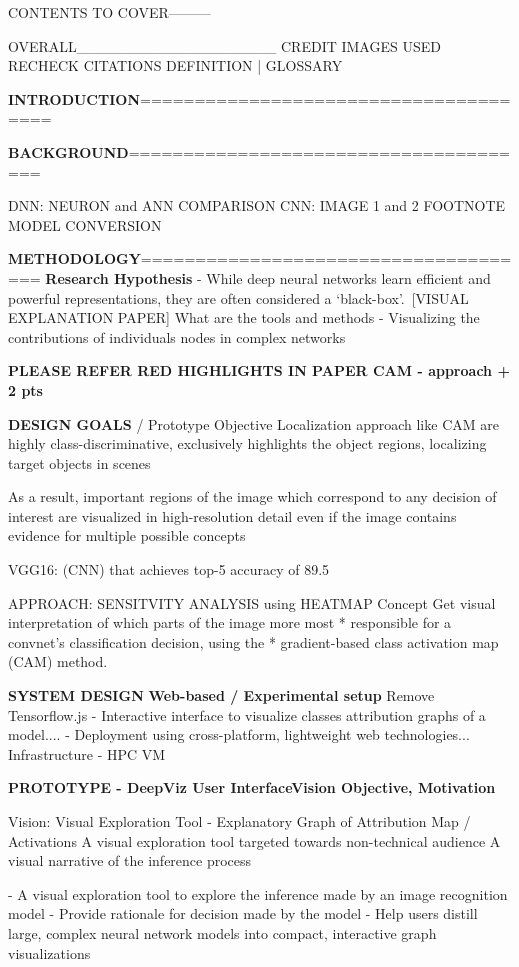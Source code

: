 CONTENTS TO COVER---------

OVERALL___________________
CREDIT IMAGES USED
RECHECK CITATIONS
DEFINITION | GLOSSARY

\textbf{INTRODUCTION}======================================

\textbf{BACKGROUND}======================================

DNN: NEURON  and ANN COMPARISON
CNN: IMAGE 1 and 2 FOOTNOTE
MODEL CONVERSION

\textbf{METHODOLOGY}=====================================
\textbf{Research Hypothesis}
- While deep neural networks learn efficient and powerful representations, they are often considered a ‘black-box’. [VISUAL EXPLANATION PAPER] What are the tools and methods 
- Visualizing the contributions of individuals nodes in complex networks

\textbf{PLEASE REFER RED HIGHLIGHTS IN PAPER CAM - approach + 2 pts}

\textbf{DESIGN GOALS} / Prototype Objective
Localization approach like CAM are highly class-discriminative, exclusively highlights the object regions, localizing target objects in scenes

As a result, important regions of the image which correspond
to any decision of interest are visualized in high-resolution
detail even if the image contains evidence for multiple possible concepts

VGG16: (CNN) that achieves top-5 accuracy of 89.5%

APPROACH: SENSITVITY ANALYSIS using HEATMAP Concept
Get visual interpretation of which parts of the image more most
 *    responsible for a convnet's classification decision, using the
 *    gradient-based class activation map (CAM) method.
 
 \textbf{SYSTEM DESIGN}
 \textbf{Web-based / Experimental setup}
 Remove Tensorflow.js
 - Interactive interface to visualize classes attribution graphs of a model....
 - Deployment using cross-platform, lightweight web technologies...
Infrastructure - HPC VM

 \textbf{PROTOTYPE - DeepViz User InterfaceVision Objective, Motivation}

Vision:  Visual Exploration Tool - Explanatory Graph of Attribution Map / Activations
A visual exploration tool targeted towards non-technical audience
A visual narrative of the inference process

- A visual exploration tool to explore the inference made by an image recognition model
- Provide rationale for decision made by the model
- Help users distill large, complex neural network models into compact, interactive graph visualizations

